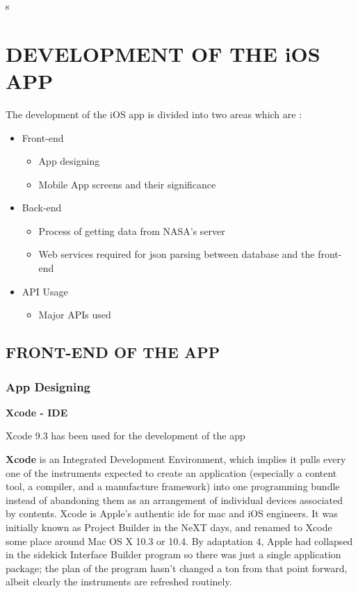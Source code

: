 s\chapter{DEVELOPMENT OF THE iOS APP}
\label{chap:development of the app}

The development of the iOS app is divided into two areas which are :

\begin{itemize}
    \item Front-end
        \begin{itemize}
            \item App designing
            \item Mobile App screens and their significance
        \end{itemize}

    \item Back-end
        \begin{itemize}
            \item Process of getting data from NASA's server
            \item Web services required for \gls{json} parsing between database and the front-end
        \end{itemize}
    
     \item API Usage
        \begin{itemize}
            \item Major APIs used
        \end{itemize}    
\end{itemize}

\section{FRONT-END OF THE APP}

\subsection{App Designing}
    
\centerline{\textbf{Xcode - IDE}}

\centerline{Xcode 9.3 has been used for the development of the app}

\textbf{Xcode} is an Integrated Development Environment, which implies it pulls every one of the instruments expected to create an application (especially a content tool, a compiler, and a manufacture framework) into one programming bundle instead of abandoning them as an arrangement of individual devices associated by contents. Xcode is Apple's authentic \gls{ide} for \gls{mac} and \gls{iOS} engineers. It was initially known as Project Builder in the NeXT days, and renamed to Xcode some place around Mac OS X 10.3 or 10.4. By adaptation 4, Apple had collapsed in the sidekick Interface Builder program so there was just a single application package; the plan of the program hasn't changed a ton from that point forward, albeit clearly the instruments are refreshed routinely. \\

